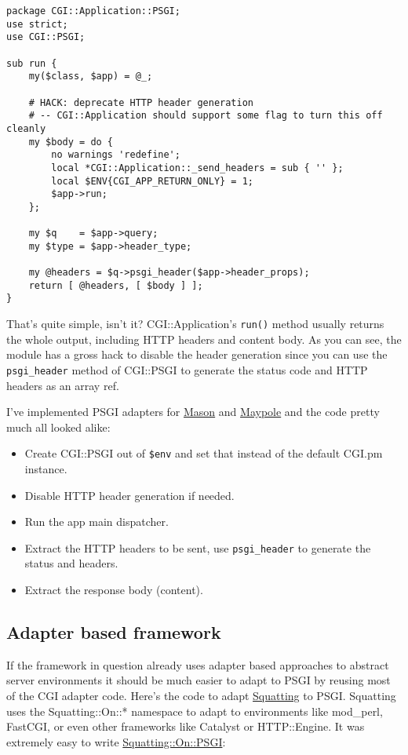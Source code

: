 \begin{lstlisting}
package CGI::Application::PSGI;
use strict;
use CGI::PSGI;

sub run {
    my($class, $app) = @_;

    # HACK: deprecate HTTP header generation
    # -- CGI::Application should support some flag to turn this off cleanly
    my $body = do {
        no warnings 'redefine';
        local *CGI::Application::_send_headers = sub { '' };
        local $ENV{CGI_APP_RETURN_ONLY} = 1;
        $app->run;
    };

    my $q    = $app->query;
    my $type = $app->header_type;

    my @headers = $q->psgi_header($app->header_props);
    return [ @headers, [ $body ] ];
}
\end{lstlisting}

That's quite simple, isn't it? CGI::Application's \lstinline!run()!
method usually returns the whole output, including HTTP headers and
content body. As you can see, the module has a gross hack to disable the
header generation since you can use the \lstinline!psgi_header! method
of CGI::PSGI to generate the status code and HTTP headers as an array
ref.

I've implemented PSGI adapters for
\href{http://search.cpan.org/perldoc?HTML::Mason}{Mason} and
\href{http://search.cpan.org/perldoc?Maypole}{Maypole} and the code
pretty much all looked alike:

\begin{itemize}
\itemsep1pt\parskip0pt
\item
  Create CGI::PSGI out of \lstinline!$env! and set that instead of the
  default CGI.pm instance.
\item
  Disable HTTP header generation if needed.
\item
  Run the app main dispatcher.
\item
  Extract the HTTP headers to be sent, use \lstinline!psgi_header! to
  generate the status and headers.
\item
  Extract the response body (content).
\end{itemize}

\subsection{Adapter based framework}\label{adapter-based-framework}

If the framework in question already uses adapter based approaches to
abstract server environments it should be much easier to adapt to PSGI
by reusing most of the CGI adapter code. Here's the code to adapt
\href{http://search.cpan.org/perldoc?Squatting}{Squatting} to PSGI.
Squatting uses the Squatting::On::* namespace to adapt to environments
like mod\_perl, FastCGI, or even other frameworks like Catalyst or
HTTP::Engine. It was extremely easy to write
\href{http://search.cpan.org/perldoc?Squatting::On::PSGI}{Squatting::On::PSGI}:

